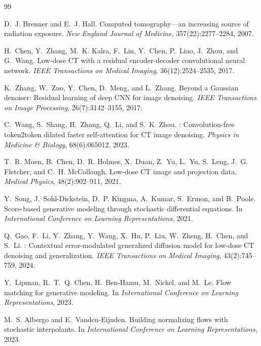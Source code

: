 \documentclass[letterpaper]{article} %
\begin{document}

\begin{thebibliography}{99}

D.~J. Brenner and E.~J. Hall.
\newblock Computed tomography---an increasing source of radiation exposure.
\newblock \emph{New England Journal of Medicine}, 357(22):2277--2284, 2007.

H.~Chen, Y.~Zhang, M.~K. Kalra, F.~Lin, Y.~Chen, P.~Liao, J.~Zhou, and
  G.~Wang.
\newblock Low-dose {CT} with a residual encoder-decoder convolutional neural
  network.
\newblock \emph{IEEE Transactions on Medical Imaging}, 36(12):2524--2535, 2017.

K.~Zhang, W.~Zuo, Y.~Chen, D.~Meng, and L.~Zhang.
\newblock Beyond a {G}aussian denoiser: Residual learning of deep {CNN} for
  image denoising.
\newblock \emph{IEEE Transactions on Image Processing}, 26(7):3142--3155, 2017.

C.~Wang, S.~Shang, H.~Zhang, Q.~Li, and S.~K. Zhou.
: Convolution-free token2token dilated faster self-attention
  for {CT} image denoising.
\newblock \emph{Physics in Medicine \& Biology}, 68(6):065012, 2023.

T.~R. Moen, B.~Chen, D.~R. Holmes, X.~Duan, Z.~Yu, L.~Yu, S.~Leng,
  J.~G. Fletcher, and C.~H. McCollough.
\newblock Low-dose {CT} image and projection data.
\newblock \emph{Medical Physics}, 48(2):902--911, 2021.

Y.~Song, J.~Sohl-Dickstein, D.~P. Kingma, A.~Kumar, S.~Ermon, and B.~Poole.
\newblock Score-based generative modeling through stochastic differential
  equations.
\newblock In \emph{International Conference on Learning Representations}, 2021.

Q.~Gao, F.~Li, Y.~Zhang, Y.~Wang, X.~Hu, P.~Liu, W.~Zheng, H.~Chen, and
  S.~Li.
: Contextual error-modulated generalized diffusion model for
  low-dose {CT} denoising and generalization.
\newblock \emph{IEEE Transactions on Medical Imaging}, 43(2):745--759, 2024.

Y.~Lipman, R.~T.~Q. Chen, H.~Ben-Hamu, M.~Nickel, and M.~Le.
\newblock Flow matching for generative modeling.
\newblock In \emph{International Conference on Learning Representations}, 2023.

M.~S. Albergo and E.~Vanden-Eijnden.
\newblock Building normalizing flows with stochastic interpolants.
\newblock In \emph{International Conference on Learning Representations}, 2023.


\end{thebibliography}
\end{document}
